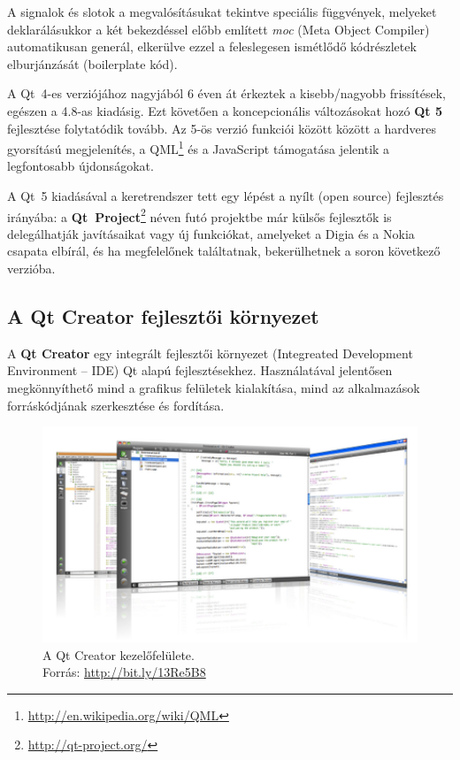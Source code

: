 A signalok és slotok a megvalósításukat tekintve speciális  függvények, melyeket deklarálásukkor a két bekezdéssel előbb említett \emph{moc} (Meta Object Compiler) automatikusan generál, elkerülve ezzel a feleslegesen ismétlődő kódrészletek elburjánzását (boilerplate kód).

\bigskip

A Qt~4-es verziójához nagyjából 6 éven át érkeztek a kisebb/nagyobb frissítések, egészen a 4.8-as kiadásig. Ezt követően a koncepcionális változásokat hozó \textbf{Qt 5} fejlesztése folytatódik tovább. Az 5-ös verzió funkciói között között a hardveres gyorsítású megjelenítés, a QML\footnote{\url{http://en.wikipedia.org/wiki/QML}} és a JavaScript támogatása jelentik a legfontosabb újdonságokat.

A Qt~5 kiadásával a keretrendszer tett egy lépést a nyílt (open source) fejlesztés irányába: a \textbf{Qt~Project}\footnote{\url{http://qt-project.org/}} néven futó projektbe már külsős fejlesztők is delegálhatják javításaikat vagy új funkciókat, amelyeket a Digia és a Nokia csapata elbírál, és ha megfelelőnek találtatnak, bekerülhetnek a soron következő verzióba.

\subsection{A Qt Creator fejlesztői környezet}\label{sect:qt_creator}

A \textbf{Qt Creator} egy integrált fejlesztői környezet (Integreated Development Environment -- IDE) Qt alapú fejlesztésekhez. Használatával jelentősen megkönnyíthető mind a grafikus felületek kialakítása, mind az alkalmazások forráskódjának szerkesztése és fordítása. \cite{qtcreator_wiki}

\begin{figure}[!ht]
\centering
\includegraphics[width=140mm, keepaspectratio]{figures/qt_creator.png}
\caption{A Qt Creator kezelőfelülete.\\Forrás: \url{http://bit.ly/13Re5B8}}
\label{fig:qt_creator}
\end{figure}

